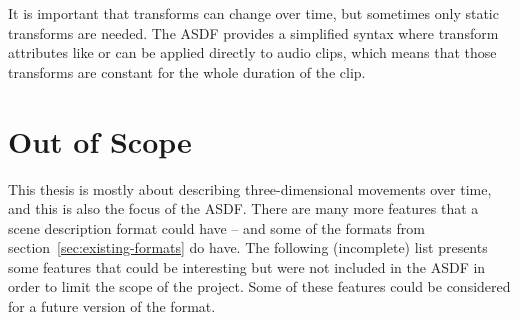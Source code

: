 It is important that transforms can change over time,
but sometimes only static transforms are needed.
The ASDF provides a simplified syntax where
transform attributes like  or  can be applied directly
to audio clips, which means that those transforms are constant
for the whole duration of the clip.


\section{Out of Scope}
\label{sec:out-of-scope}

This thesis is mostly about describing three-dimensional movements over time,
and this is also the focus of the ASDF.
There are many more features that a scene description format could have
-- and some of the formats from section~\ref{sec:existing-formats} do have.
The following (incomplete) list presents some features that could be interesting
but were not included in the ASDF in order to limit the scope of the project.
Some of these features could be considered for a future version of the format.

\baselineskip


